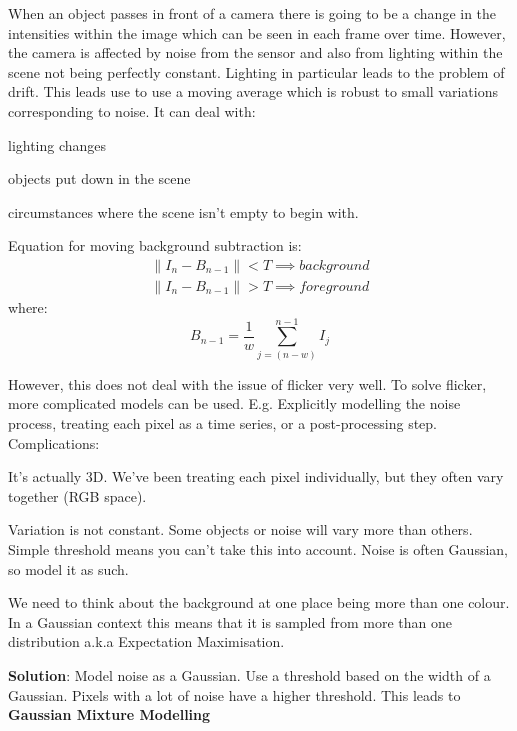 \documentclass[8pt]{extarticle}
\begin{document}
\begin{multicols}{2}
When an object passes in front of a camera there is going to be a change in the intensities within the image which can be seen in each frame over time. However, the camera is affected by noise from the sensor and also from lighting within the scene not being perfectly constant. Lighting in particular leads to the problem of drift. This leads use to  use a moving average which is robust to small variations corresponding to noise. It can deal with:

\begin{compactitem}
    \item lighting changes
    \item objects put down in the scene
    \item circumstances where the scene isn't empty to begin with.
\end{compactitem}

Equation for moving background subtraction is:
\begin{gather}
    \|I_n - B_{n-1}\| < T \implies background \\
    \|I_n - B_{n-1}\| > T \implies foreground
\end{gather}
where:
\begin{equation}
    B_{n-1} = \frac{1}{w}\sum\limits_{j=(n-w)}^{n-1}I_j
\end{equation}

However, this does not deal with the issue of flicker very well. To solve flicker, more complicated models can be used. E.g. Explicitly modelling the noise process, treating each pixel as a time series, or a post-processing step. Complications:

\begin{compactitem}
    \item It's actually 3D. We've been treating each pixel individually, but they often vary together (RGB space).
    \item Variation is not constant. Some objects or noise will vary more than others. Simple threshold means you can't take this into account. Noise is often Gaussian, so model it as such.
    \item We need to think about the background at one place being more than one colour. In a Gaussian context this means that it is sampled from more than one distribution a.k.a Expectation Maximisation.
\end{compactitem}

\textbf{Solution}: Model noise as a Gaussian. Use a threshold based on the width of a Gaussian. Pixels with a lot of noise have a higher threshold. This leads to \textbf{Gaussian Mixture Modelling}


\end{multicols}
\end{document}
